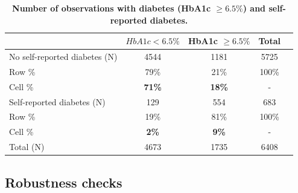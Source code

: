\documentclass[12pt,english]{article}
\begin{document}
\clearpage

\begin{table}[!ht]
	\caption{\label{tab:Biomarker_observations}{\bf Number of observations with diabetes (HbA1c $\geq 6.5\%$) and self-reported diabetes.}}
	\begin{center}
		\begin{adjustbox}{max width=\linewidth}
			\begin{threeparttable}
				{
					\def\sym#1{\ifmmode^{#1}\else\(^{#1}\)\fi}
					\begin{tabular}{lcccc}
						\toprule
						&\multicolumn{1}{c}{$HbA1c < 6.5\%$}&\multicolumn{1}{c}{HbA1c $\geq 6.5\%$}&\multicolumn{1}{c}{Total}\\
						\midrule
						No self-reported diabetes (N) & 4544 & 1181 & 5725 &  \\
						\hspace*{10mm}Row  \% & 79\% & 21\% & 100\% &  \\
						\hspace*{10mm}Cell \% & \textbf{71\%} & \textbf{18\%} & - & \\
						Self-reported diabetes (N) & 129 & 554 & 683 &  \\
						\hspace*{10mm}Row \%  & 19\% & 81\% & 100\% &  \\
						\hspace*{10mm}Cell \% & \textbf{2\%} &\textbf{9\%} &- & \\
						Total (N) & 4673 & 1735 & 6408 &  \\ 
						\bottomrule
					\end{tabular}
					\begin{tablenotes}
						\item
					\end{tablenotes}
				}
			\end{threeparttable}
		\end{adjustbox}
	\end{center}
\end{table}


\clearpage

\subsection*{Robustness checks}
\end{document}
